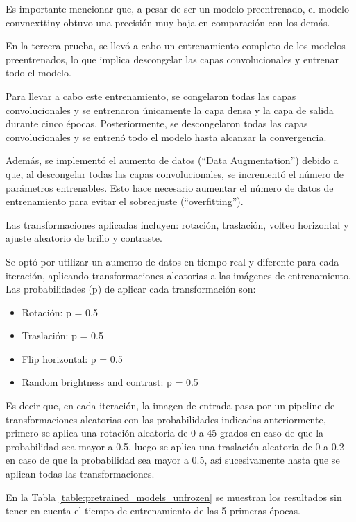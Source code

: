 \documentclass[10pt,a4paper,twocolumn,twoside]{article}
\begin{document}
Es importante mencionar que, a pesar de ser un modelo preentrenado, el modelo convnexttiny obtuvo una precisión muy baja en comparación con los demás.

En la tercera prueba, se llevó a cabo un entrenamiento completo de los modelos preentrenados, lo que implica descongelar las capas convolucionales y entrenar todo el modelo.

Para llevar a cabo este entrenamiento, se congelaron todas las capas convolucionales y se entrenaron únicamente la capa densa y la capa de salida durante cinco épocas. Posteriormente, se descongelaron todas las capas convolucionales y se entrenó todo el modelo hasta alcanzar la convergencia.

Además, se implementó el aumento de datos (``Data Augmentation'') debido a que, al descongelar todas las capas convolucionales, se incrementó el número de parámetros entrenables. Esto hace necesario aumentar el número de datos de entrenamiento para evitar el sobreajuste (``overfitting'').

Las transformaciones aplicadas incluyen: rotación, traslación, volteo horizontal y ajuste aleatorio de brillo y contraste.

Se optó por utilizar un aumento de datos en tiempo real y diferente para cada iteración, aplicando transformaciones aleatorias a las imágenes de entrenamiento. Las probabilidades (p) de aplicar cada transformación son:

\begin{itemize}[noitemsep]
  \item[] Rotación: p = 0.5
  \item[] Traslación: p = 0.5
  \item[] Flip horizontal: p = 0.5
  \item[] Random brightness and contrast: p = 0.5
\end{itemize}

Es decir que, en cada iteración, la imagen de entrada pasa por un pipeline de transformaciones aleatorias con las probabilidades indicadas anteriormente,
primero se aplica una rotación aleatoria de 0 a 45 grados en caso de que la probabilidad sea mayor a 0.5, luego se aplica una traslación aleatoria de 0 a 0.2 en caso de que la probabilidad sea mayor a 0.5,
así sucesivamente hasta que se aplican todas las transformaciones.

En la Tabla \ref{table:pretrained_models_unfrozen} se muestran los resultados sin tener en cuenta el tiempo de entrenamiento de las 5 primeras épocas.
\end{document}
